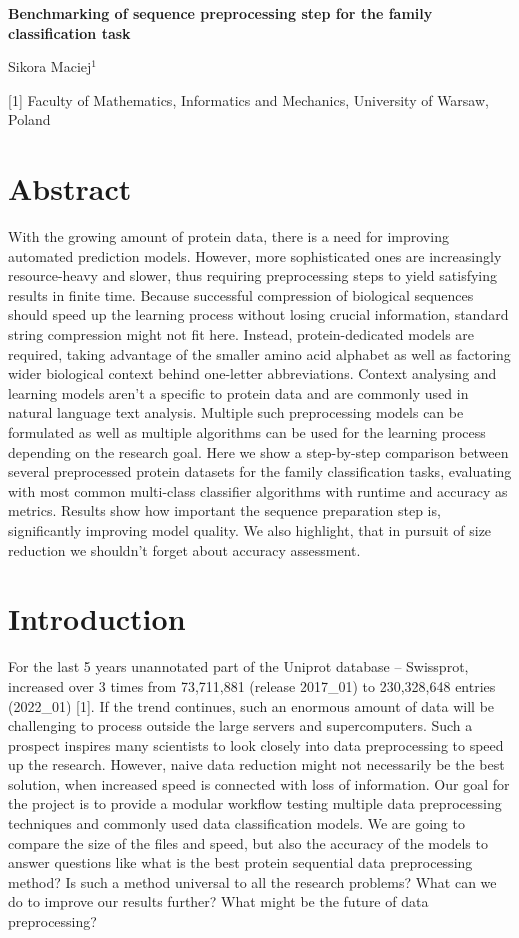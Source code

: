 \documentclass[12pt]{article}
\begin{document}
\begin{center}
\textbf{Benchmarking of sequence preprocessing step for the family classification task}
\end{center}


\begin{center}
Sikora Maciej$^{1}$
\end{center}

[1] Faculty of Mathematics, Informatics and Mechanics, University of Warsaw, Poland \newline

\section*{Abstract}
With the growing amount of protein data, there is a need for improving automated prediction models. However, more sophisticated ones are increasingly resource-heavy and slower, thus requiring preprocessing steps to yield satisfying results in finite time. Because successful compression of biological sequences should speed up the learning process without losing crucial information, standard string compression might not fit here. Instead, protein-dedicated models are required, taking advantage of the smaller amino acid alphabet as well as factoring wider biological context behind one-letter abbreviations.
Context analysing and learning models aren't a specific to protein data and are commonly used in natural language text analysis. Multiple such preprocessing models can be formulated as well as multiple algorithms can be used for the learning process depending on the research goal. Here we show a step-by-step comparison between several preprocessed protein datasets for the family classification tasks, evaluating with most common multi-class classifier algorithms with runtime and accuracy as metrics. Results show how important the sequence preparation step is, significantly improving model quality. We also highlight, that in pursuit of size reduction we shouldn't forget about accuracy assessment.

\section*{Introduction}
For the last 5 years unannotated part of the Uniprot database -- Swissprot, increased over 3 times from 73,711,881 (release 2017\_01) to 230,328,648 entries (2022\_01) [1]. If the trend continues, such an enormous amount of data will be challenging to process outside the large servers and supercomputers. Such a prospect inspires many scientists to look closely into data preprocessing to speed up the research. However, naive data reduction might not necessarily be the best solution, when increased speed is connected with loss of information. Our goal for the project is to provide a modular workflow testing multiple data preprocessing techniques and commonly used data classification models. We are going to compare the size of the files and speed, but also the accuracy of the models to answer questions like what is the best protein sequential data preprocessing method? Is such a method universal to all the research problems? What can we do to improve our results further? What might be the future of data preprocessing?
\end{document}
